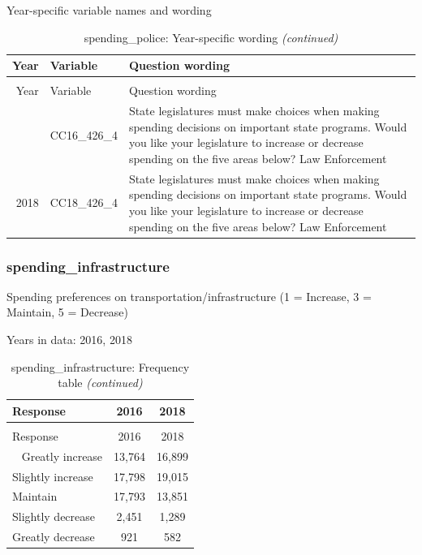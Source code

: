 \documentclass[12pt]{article}
\begin{document}
\endgroup{}

Year-specific variable names and wording

\begin{longtable}[t]{rl>{\raggedright\arraybackslash}p{10cm}}
\caption{\label{tab:unnamed-chunk-4}spending\_police: Year-specific wording}\\
\toprule
Year & Variable & Question wording\\
\midrule
\endfirsthead
\caption[]{spending\_police: Year-specific wording \textit{(continued)}}\\
\toprule
Year & Variable & Question wording\\
\midrule
\endhead
\
\endfoot
\bottomrule
\endlastfoot
2016 & CC16\_426\_4 & State legislatures must make choices when making spending decisions on important state programs. Would you like your legislature to increase or decrease spending on the five areas below? Law Enforcement\\
2018 & CC18\_426\_4 & State legislatures must make choices when making spending decisions on important state programs. Would you like your legislature to increase or decrease spending on the five areas below? Law Enforcement\\*
\end{longtable}

\subsubsection{spending\_infrastructure}\label{spending_infrastructure}

Spending preferences on transportation/infrastructure (1 = Increase, 3 =
Maintain, 5 = Decrease)

Years in data: 2016, 2018\begingroup\fontsize{10}{12}\selectfont

\begin{longtable}[t]{lcc}
\caption{\label{tab:unnamed-chunk-4}spending\_infrastructure: Frequency table}\\
\toprule
Response & 2016 & 2018\\
\midrule
\endfirsthead
\caption[]{spending\_infrastructure: Frequency table \textit{(continued)}}\\
\toprule
Response & 2016 & 2018\\
\midrule
\endhead
\
\endfoot
\bottomrule
\endlastfoot
Greatly increase & 13,764 & 16,899\\
Slightly increase & 17,798 & 19,015\\
Maintain & 17,793 & 13,851\\
Slightly decrease & 2,451 & 1,289\\
Greatly decrease & 921 & 582\\*
\end{longtable}
\end{document}
